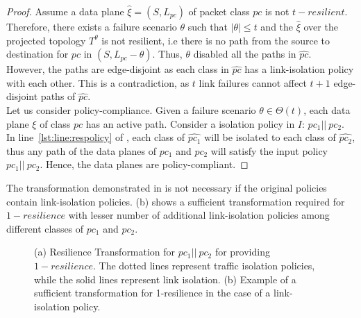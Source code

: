 \begin{proof}
	Assume a data plane $\hat{\xi} = (S, L_{pc})$ of packet class $pc$ is not $t-resilient$. 
	Therefore, there exists a failure scenario $\theta$ such that $|\theta| \leq t$ 
	and  the $\hat{\xi}$ over the projected topology $T^\theta$ 
	is not resilient, i.e there is no path from the source to destination for
	$pc$ in $(S,L_{pc} - \theta)$.
	Thus, $\theta$ disabled all the paths in $\hat{pc}$. \\
	However, the paths are
	edge-disjoint as each class in $\hat{pc}$ has a link-isolation policy with each 
	other. This is a contradiction, as $t$ link failures cannot affect $t+1$ 
	edge-disjoint paths of $\hat{pc}$. \\
	Let us consider policy-compliance. Given a failure scenario $\theta \in \Theta(t)$, each data plane $\xi$ of class $pc$ has an active path. Consider a isolation policy in $I$: $pc_1 || \ pc_2$. In line~\ref{lst:line:respolicy} of , each class of $\hat{pc_1}$ will be isolated to
	each class of $\hat{pc_2}$, thus any path of the data planes of $pc_1$ and
	$pc_2$ will satisfy the input policy $pc_1 || \ pc_2$. Hence, the data planes 
	are policy-compliant. 
\end{proof}
The transformation demonstrated in  is not necessary
 if the original policies contain link-isolation policies. (b) shows a sufficient transformation required for $1-resilience$ 
 with lesser number of additional link-isolation policies among different classes
 of $pc_1$ and $pc_2$. 
\begin{figure}
	\centering
	\caption{\label{fig:restransform}
		(a) Resilience Transformation for $pc_1 || \ pc_2$ for providing $1-resilience$. 
		The dotted lines represent traffic isolation policies, 
		while the solid lines represent link isolation. (b) Example of a sufficient transformation
		for 1-resilience in the case of a link-isolation policy.}
\end{figure}

